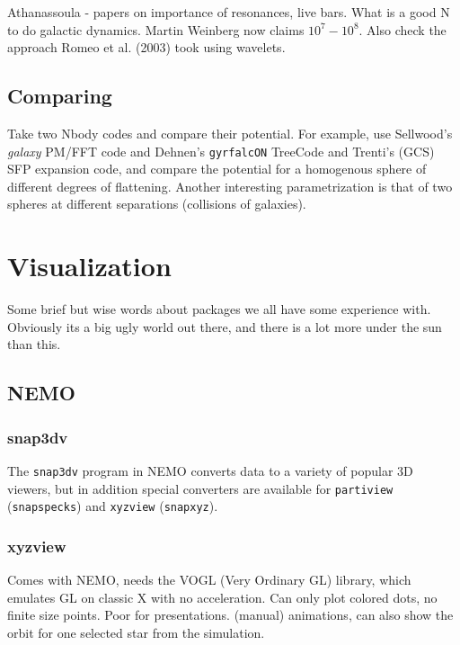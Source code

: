 Athanassoula - papers on importance of resonances, live bars. What is a good N to do
galactic dynamics. Martin Weinberg now claims $10^7-10^8$. 
Also check the approach Romeo et al. (2003) took using wavelets.

\section{Comparing}

Take two Nbody codes and compare their potential. For example, use Sellwood's 
{\it galaxy} PM/FFT code and Dehnen's {\tt gyrfalcON} TreeCode and Trenti's
(GCS) SFP expansion code,
and compare the
potential for a homogenous sphere of different degrees of flattening.
Another interesting parametrization is that of two spheres at
different separations (collisions of galaxies).


\chapter                {Visualization}

Some brief but wise words about packages we all have some experience with.
Obviously its a big ugly world out there, and there is a lot more under the
sun than this.

\section{NEMO}


\subsection{snap3dv}

The {\tt snap3dv} program in NEMO converts data to a variety of popular
3D viewers, but in addition special converters are available 
for {\tt partiview} ({\tt snapspecks}) and {\tt xyzview} ({\tt snapxyz}).

\subsection{xyzview}

Comes with NEMO, needs the VOGL (Very Ordinary GL) library, which emulates
GL on classic X with no acceleration. Can only plot colored dots, no finite
size points. Poor for presentations. (manual) animations, can also show
the orbit for one selected star from the simulation. 



